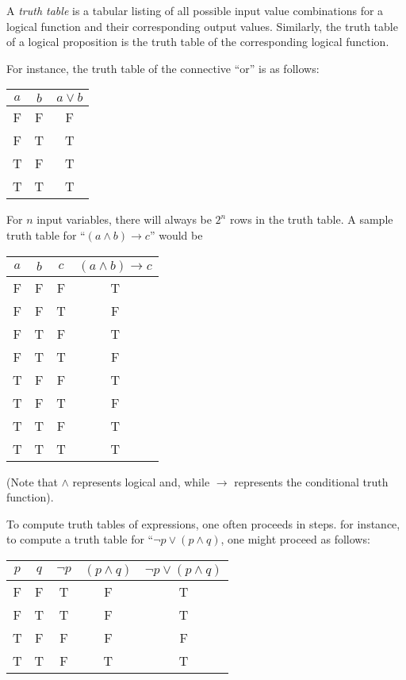 \documentclass[12pt]{article}
\begin{document}
A \emph{truth table} is a tabular listing of all possible input value combinations for a logical function and their corresponding output values.  Similarly, the truth table of a logical proposition is the truth table of the corresponding logical function. 

For instance, the truth table of the connective ``or'' is as follows:
\begin{center}
\begin{tabular}{ccc}
$a$ & $b$ & $a \lor b$ \\
\hline 
F & F & F \\
F & T & T \\
T & F & T \\
T & T & T 
\end{tabular}
\end{center}

For $n$ input variables, there will always be $2^n$ rows in the truth table.  
A sample truth table for ``$(a \land b) \rightarrow c$'' would be

\begin{center}
\begin{tabular}{cccc}
$a$ & $b$ & $c$ & $(a \land b) \rightarrow c$ \\
\hline 
F & F & F & T \\
F & F & T & F \\
F & T & F & T \\
F & T & T & F \\
T & F & F & T \\
T & F & T & F \\
T & T & F & T \\
T & T & T & T 
\end{tabular}
\end{center}

(Note that $\land$ represents logical and, while $\rightarrow$ represents the conditional truth function).

To compute truth tables of expressions, one often proceeds in steps.  for instance, 
to compute a truth table for ``$\neg p \lor (p \land q)$, one might proceed as follows:

\begin{center}
\begin{tabular}{ccccc}
$p$ & $q$ & $\neg p$ & $(p \land q)$ & $\neg p \lor (p \land q)$ \\
\hline 
F & F & T & F & T \\
F & T & T & F & T \\
T & F & F & F & F \\
T & T & F & T & T
\end{tabular}
\end{center}
\end{document}

